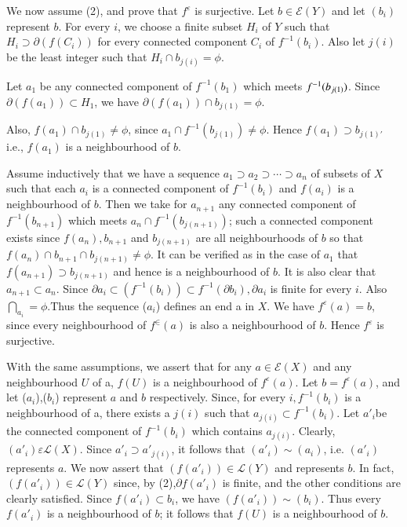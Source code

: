 We now assume (2), and prove that $f ^{\varepsilon}$ is
surjective. Let $b \in \mathscr{E}(Y)$ and let $(b_i)$ represent
$b$. For every $i$, we choose a finite subset $H_i$ of $Y$ such
that $H_i \supset \partial (f(C_i))$ for every connected
component $C_i$ of $f^{-1}(b_i)$. Also let $j(i)$ be the least
integer such that $H_i \cap b_{j(i)}= \phi$. 

Let $a_1$ be any  connected component of $f^{-1}(b_1)$ which
meets $f^{-1}\break (b_{j(1)})$. Since $\partial(f(a_1)) \subset H_1$,
we have $\partial(f(a_1)) \cap b_{j(1)} = \phi$.  

Also, $f(a_1) \cap b_{j(1)} \neq \phi$, since $a_1 \cap
f^{-1}(b_{j(1)})  \neq \phi$. Hence $f(a_1) \supset b_{j(1)'}$
i.e., $f(a_1)$ is a neighbourhood of $b$. 

Assume inductively that we have a sequence $a_1 \supset a_2
\supset \cdots \supset a_n$ of subsets of $X$ such that each
$a_i$ is a connected component of $f^{-1}(b_i)$ and $f(a_i)$ is a
neighbourhood of $b$. Then we take for $a_{n+1}$ any  connected
component of $f^{-1}(b_{n+1})$ which meets $a_n \cap
f^{-1}(b_{j(n+1)})$; such a connected component exists since  $f (a_n),
b_{n+1}$ and  $b _{j (n+1)}$ are all neighbourhoods of $b$ so
that $f(a_n) \cap b_{n+1} \cap b_{j(n+1)} \neq  \phi$. It can be
verified as in the case of $a_1$ that $f(a_{n+1}) \supset
b_{j(n+1)}$ and hence is a neighbourhood of $b$. It is also clear
that $a_{n+1} \subset a_n$. Since $\partial a_i
\subset(f^{-1}(b_i)) \subset f^{-1}(\partial b_i), \partial a_i$
is finite for every $i$.  Also  $\bigcap_{a_i}= \phi$.\pageoriginale Thus the
sequence ($a_i$) defines an end  a in $X$. We have
$f^\varepsilon(a) = b$, since every neighbourhood of $f ^\in (a)$
is also a neighbourhood of $b$. Hence $f^\varepsilon$ is
surjective. 

With the same assumptions, we assert that for any $a \in
\mathscr{E}(X) $ and any neighbourhood $U$ of a, $f(U)$ is a
neighbourhood of $f^\varepsilon (a)$. Let $ b = f^\varepsilon (a)$,
and let ($a_i$),($b_i$) represent $a$ and $b$ respectively. Since, for
every $i, f ^{-1}(b_i)$ is a neighbourhood of a, there exists a $j(i)$
such that $a_{j(i)}\subset f^{-1}(b_i)$. Let $a	'_i$be the connected
component of $f^{-1}(b_i)$  which contains $a_{j(i)}$. Clearly, $(a'_i)
\varepsilon \mathscr{L}(X)$. Since $a'_i \supset a'_{j(i)}$, it
follows that $(a'_i)\sim (a_i)$, i.e. $(a'_i)$ represents $a$. We now
assert that $(f (a'_i))\in \mathscr{L}(Y)$ and represents $b$. In
fact, $(f (a'_i))\in \mathscr{L}(Y)$ since, by (2),$\partial f
(a'_i)$ is finite, and the other conditions are clearly
satisfied. Since $f(a'_i)\subset b_i$, we have $(f(a'_i)) \sim (b_i)$.
Thus every $f(a'_i)$ is a neighbourhood of $b$;  it follows that
$f(U)$ is a neighbourhood of $b$. 

